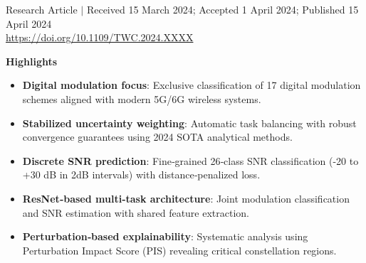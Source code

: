 \documentclass{ELSP}
\begin{document}
\thispagestyle{firstpage}

\let\thefootnote\relax
{}

\begin{flushleft}
{\sffamily \small Research Article $\mid$ Received 15 March 2024; Accepted 1 April 2024; Published 15 April 2024}\\
{\sffamily \small\url{https://doi.org/10.1109/TWC.2024.XXXX}}




\end{flushleft}

\vspace{0.5em}
\noindent\textbf{\textcolor[RGB]{0,131,255}{Highlights}}
\begin{itemize}
  \item \textbf{Digital modulation focus}: Exclusive classification of 17 digital modulation schemes aligned with modern 5G/6G wireless systems.
  \item \textbf{Stabilized uncertainty weighting}: Automatic task balancing with robust convergence guarantees using 2024 SOTA analytical methods.
  \item \textbf{Discrete SNR prediction}: Fine‑grained 26‑class SNR classification (-20 to +30 dB in 2dB intervals) with distance‑penalized loss.
  \item \textbf{ResNet‑based multi‑task architecture}: Joint modulation classification and SNR estimation with shared feature extraction.
  \item \textbf{Perturbation‑based explainability}: Systematic analysis using Perturbation Impact Score (PIS) revealing critical constellation regions.
\end{itemize}
\end{document}
